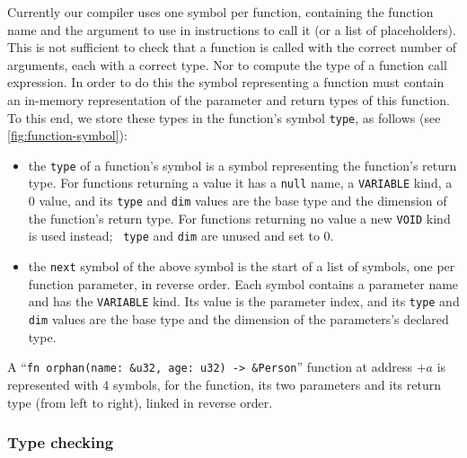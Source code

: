 Currently our compiler uses one symbol per function, containing the function
name and the argument to use in  instructions to call it (or a list
of placeholders). This is not sufficient to check that a function is called
with the correct number of arguments, each with a correct type. Nor to compute
the type of a function call expression. In order to do this the symbol
representing a function must contain an in-memory representation of the
parameter and return types of this function. To this end, we store these types
in the function's symbol {\tt type}, as follows (see
\cref{fig:function-symbol}):
\begin{itemize}
  \item the {\tt type} of a function's symbol is a symbol representing the
  function's return type. For functions returning a value it has a {\tt null}
  name, a {\tt VARIABLE} kind, a 0 value, and its {\tt type} and {\tt dim}
  values are the base type and the dimension of the function's return type. For
  functions returning no value a new {\tt VOID} kind is used instead; {\tt
  type} and {\tt dim} are unused and set to 0.

  \item the {\tt next} symbol of the above symbol is the start of a list of
  symbols, one per function parameter, in reverse order. Each symbol contains a
  parameter name and has the {\tt VARIABLE} kind. Its value is the parameter
  index, and its {\tt type} and {\tt dim} values are the base type and the
  dimension of the parameters's declared type.
\end{itemize}

\begin{Figure}
  

  \caption{A ``{\tt fn orphan(name: \&u32, age: u32) -> \&Person}'' function at
  address $+a$ is represented with 4 symbols, for the function, its
  two parameters and its return type (from left to right), linked in reverse
  order.}\label{fig:function-symbol}
\end{Figure}

\subsubsection{Type checking}

